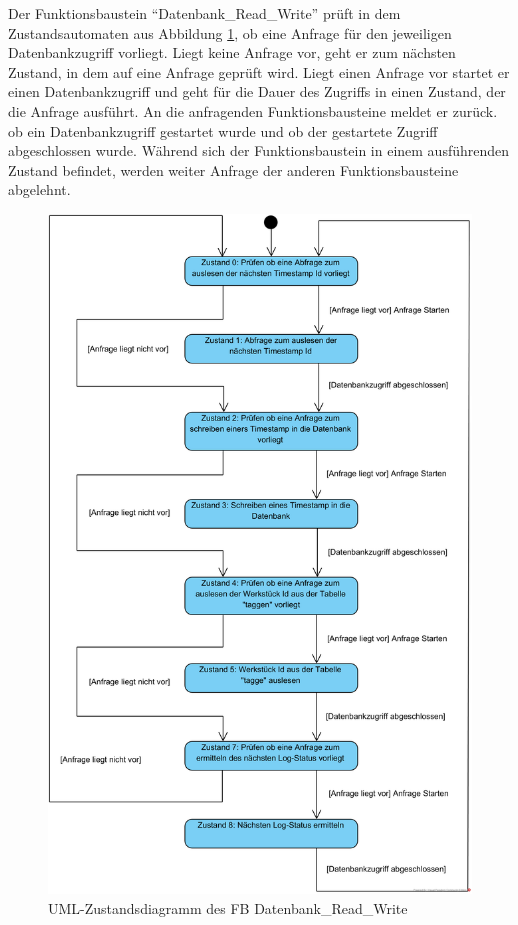 Der Funktionsbaustein "`Datenbank\_Read\_Write"' prüft in dem Zustandsautomaten aus Abbildung \ref{fig:FB_Datenbank_Read_Write}, ob eine Anfrage für den jeweiligen Datenbankzugriff vorliegt. Liegt keine Anfrage vor, geht er zum nächsten Zustand, in dem auf eine Anfrage geprüft wird. Liegt einen Anfrage vor startet er einen Datenbankzugriff und geht für die Dauer des Zugriffs in einen Zustand, der die Anfrage ausführt. An die anfragenden Funktionsbausteine meldet er zurück. ob ein Datenbankzugriff gestartet wurde und ob der gestartete Zugriff abgeschlossen wurde.  Während sich der Funktionsbaustein in einem ausführenden Zustand befindet, werden weiter Anfrage der anderen Funktionsbausteine abgelehnt.
\begin{figure}[!htb]
	    \centering
	    \includegraphics[width=0.8\linewidth]{Bilder/Zustandsdiagramme/Datenbank_Read_Write_State_Machine_Diagram.png}
        \caption{UML-Zustandsdiagramm des FB Datenbank\_Read\_Write}
        \label{fig:FB_Datenbank_Read_Write}
\end{figure}

